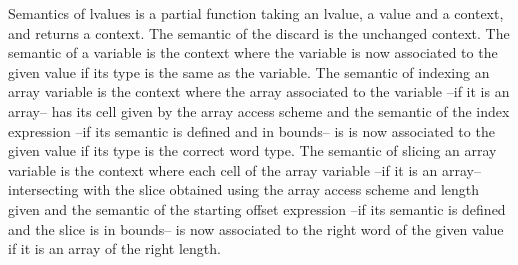 \documentclass{article}
\begin{document}
Semantics of lvalues is a partial function taking an lvalue, a value
and a context, and returns a context.
The semantic of the discard is the unchanged context. The semantic of a variable
is the context where the variable is now associated to the given value if its
type is the same as the variable. The semantic of indexing an array variable is
the context where the array associated to the variable --if it is an array-- has
its cell given by the array access scheme and the semantic of the index
expression --if its semantic is defined and in bounds-- is is now associated to
the given value if its type is the correct word type. The semantic of slicing an
array variable is the context where each cell of the array variable --if it is
an array-- intersecting with the slice obtained using the array access scheme
and length given and the semantic of the starting offset expression --if its
semantic is defined and the slice is in bounds-- is now associated to the right
word of the given value if it is an array of the right length.

\medskip
\end{document}
